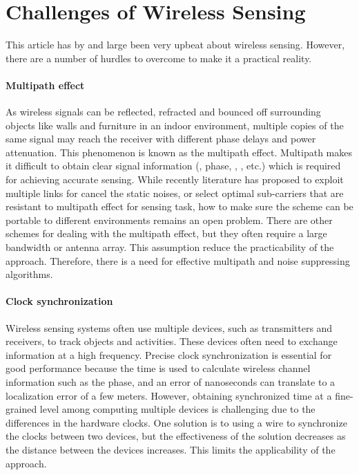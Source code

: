 \section{Challenges of Wireless Sensing}
This article has by and large been very upbeat about wireless sensing. However, there are a number of hurdles to overcome to make it a
practical reality.

\paragraph*{Multipath effect}  As wireless signals can be reflected, refracted and bounced off
surrounding objects like walls and furniture in an indoor environment, multiple copies of the same signal may reach the receiver with
different phase delays and power attenuation. This phenomenon is known as the multipath effect. Multipath makes it difficult to obtain
clear signal information (\RSSI, phase, \AoA, \TOF, etc.) which is required for achieving accurate sensing. While recently literature has
proposed to exploit multiple links for cancel the static noises, or select optimal sub-carriers that are resistant to multipath effect for
sensing task, how to make sure the scheme can be portable to different environments remains an open problem. There are other schemes for
dealing with the multipath effect, but they often require a large bandwidth or antenna array. This assumption reduce the practicability of
the approach. Therefore, there is a need for effective multipath and noise suppressing algorithms.

\paragraph*{Clock synchronization} Wireless sensing systems often use multiple devices, such as transmitters and receivers, to track objects and activities. These devices often
need to exchange information at a high frequency. Precise clock synchronization is essential for good performance because the time is used
to calculate wireless channel information such as the phase, and an error of nanoseconds can translate to a localization error of a few
meters. However, obtaining synchronized time at a fine-grained level among computing multiple devices is challenging due to the differences
in the hardware clocks. One solution is to using a wire to synchronize the clocks between two devices, but the effectiveness of the
solution decreases as the distance between the devices increases. This limits the applicability of the approach.

